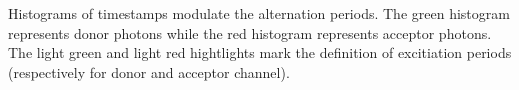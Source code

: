 \label{fig:altern_hist}
Histograms of timestamps modulate the alternation periods. The green histogram represents
donor photons while the red histogram represents acceptor photons. The light green and
light red hightlights mark the definition of excitiation periods (respectively
for donor and acceptor channel). 
